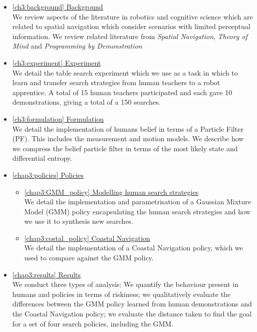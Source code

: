 \begin{itemize}

\item  \hyperref[ch3:background]{\ref{ch3:background}   Background}\\
We review aspects of the literature in robotics and cognitive science which are related to spatial navigation which 
consider scenarios with limited perceptual information. We review related literature from \textit{Spatial Navigation}, 
\textit{Theory of Mind} and \textit{Programming by Demonstration}

\item  \hyperref[ch3:experiment]{\ref{ch3:experiment}   Experiment}\\
We detail the table search experiment which we use as a task in which to learn and transfer search strategies from human teachers to a robot 
apprentice. A total of 15 human teachers participated and each gave 10 demonstrations, 
giving a total of a 150 searches.

\item  \hyperref[ch3:formulation]{\ref{ch3:formulation}  Formulation}\\
We detail the implementation of humans belief in terms of a Particle Filter (PF). This includes the measurement and motion 
models. We describe how we compress the belief particle filter in terms of the most likely state and differential entropy.

\item  \hyperref[chap3:policies]{\ref{chap3:policies} 	Policies}
\begin{itemize}
  \item \hyperref[chap3:GMM_policy]{\ref{chap3:GMM_policy} Modelling human search strategies}\\
  We detail the implementation and parametrisation of a Gaussian Mixture Model (GMM) policy encapsulating
the human search strategies and how we use it to synthesis new searches.
  \item \hyperref[chap3:costal_policy]{\ref{chap3:costal_policy} Coastal Navigation}\\
  We detail the implementation of a Coastal Navigation policy, which we used to compare against the GMM policy.
\end{itemize}

\item  \hyperref[chap3:results]{\ref{chap3:results} 	Results}\\
We conduct three types of analysis: We quantify the behaviour present in humans and policies in terms of riskiness; we 
qualitatively evaluate the differences between the GMM policy learned from human demonstrations and the Coastal Navigation policy;
we evaluate the distance taken to find the goal for a set of four search policies, including the GMM.

\end{itemize}

